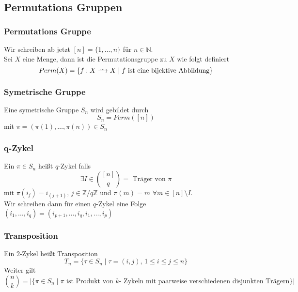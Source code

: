 \documentclass[12pt, german]{article}
\newcommand\iso{\xrightarrow{
		\,\smash{\raisebox{-0.65ex}{\ensuremath{\scriptstyle\sim}}}\,}}
\begin{document}
\subsection{Permutations Gruppen}
\subsubsection{Permutations Gruppe}
		Wir schreiben ab jetzt $[n] = \{1, \ldots, n\}$ für $n \in \mathbb N$.  \\ 
		\newline
		Sei $X$ eine Menge, dann ist die Permutationsgruppe zu $X$ wie folgt definiert 
		$$Perm(X)= \{ f: X \iso X \mid f \text{ ist eine bijektive Abbildung}\}$$

\subsubsection{Symetrische Gruppe}
Eine symetrische Gruppe $S_n$ wird gebildet durch $$S_n = Perm([n])$$ mit $\pi = (\pi(1), \ldots, \pi(n)) \in S_n$

\subsubsection{q-Zykel}
	Ein $\pi \in S_n$ heißt $q$-Zykel falls $$ \exists I \in \binom{[n]}{q} = \text{ Träger von $\pi$}$$ mit $\pi(i_j) = i_{(j+1)}, \, j \in \mathbb Z / q \mathbb Z$ und $\pi(m)= m$ $\forall m \in [n]  \setminus  I$. \\ 
	Wir schreiben dann für einen $q$-Zykel eine Folge $(i_1, \ldots, i_q) = (i_{p+1}, \ldots, i_q, i_1, \ldots, i_p)$

\subsubsection{Transposition}
	Ein $2$-Zykel heißt Transposition $$T_n = \{ \tau \in S_n  \mid \tau = (i, j), \, 1 \leq i \leq j \leq n\}$$
	Weiter gilt $$\binom{n}{k} = |\{ \pi \in S_n \mid \pi \text{ ist Produkt von $k$- Zykeln  mit paarweise verschiedenen disjunkten Trägern} \}|$$
\end{document}
